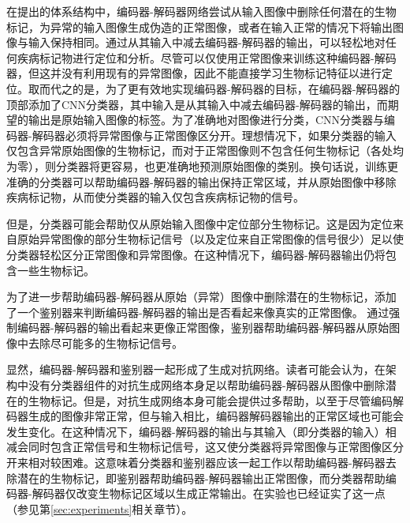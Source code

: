 在提出的体系结构中，编码器-解码器网络尝试从输入图像中删除任何潜在的生物标记，为异常的输入图像生成伪造的正常图像，或者在输入正常的情况下将输出图像与输入保持相同。通过从其输入中减去编码器-解码器的输出，可以轻松地对任何疾病标记物进行定位和分析。尽管可以仅使用正常图像来训练这种编码器-解码器，但这并没有利用现有的异常图像，因此不能直接学习生物标记特征以进行定位。取而代之的是，为了更有效地实现编码器-解码器的目标，在编码器-解码器的顶部添加了CNN分类器，其中输入是从其输入中减去编码器-解码器的输出，而期望的输出是原始输入图像的标签。为了准确地对图像进行分类，CNN分类器与编码器-解码器必须将异常图像与正常图像区分开。理想情况下，如果分类器的输入仅包含异常原始图像的生物标记，而对于正常图像则不包含任何生物标记（各处均为零），则分类器将更容易，也更准确地预测原始图像的类别。换句话说，训练更准确的分类器可以帮助编码器-解码器的输出保持正常区域，并从原始图像中移除疾病标记物，从而使分类器的输入仅包含疾病标记物的信号。

但是，分类器可能会帮助仅从原始输入图像中定位部分生物标记。这是因为定位来自原始异常图像的部分生物标记信号（以及定位来自正常图像的信号很少）足以使分类器轻松区分正常图像和异常图像。在这种情况下，编码器-解码器输出仍将包含一些生物标记。

为了进一步帮助编码器-解码器从原始（异常）图像中删除潜在的生物标记，添加了一个鉴别器来判断编码器-解码器的输出是否看起来像真实的正常图像。 通过强制编码器-解码器的输出看起来更像正常图像，鉴别器帮助编码器-解码器从原始图像中去除尽可能多的生物标记信号。

显然，编码器-解码器和鉴别器一起形成了生成对抗网络。读者可能会认为，在架构中没有分类器组件的对抗生成网络本身足以帮助编码器-解码器从图像中删除潜在的生物标记。但是，对抗生成网络本身可能会提供过多帮助，以至于尽管编码解码器生成的图像非常正常，但与输入相比，编码器解码器输出的正常区域也可能会发生变化。在这种情况下，编码器-解码器的输出与其输入（即分类器的输入）相减会同时包含正常信号和生物标记信号，这又使分类器将异常图像与正常图像区分开来相对较困难。这意味着分类器和鉴别器应该一起工作以帮助编码器-解码器去除潜在的生物标记，即鉴别器帮助编码器-解码器输出正常图像，而分类器帮助编码器-解码器仅改变生物标记区域以生成正常输出。在实验也已经证实了这一点（参见第\ref{sec:experiments}相关章节）。

